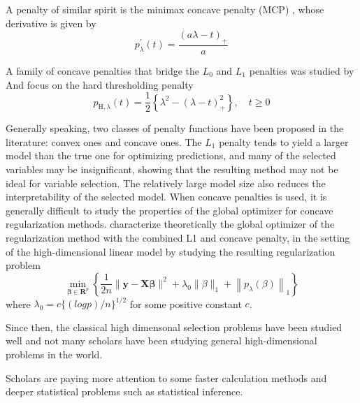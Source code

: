 \documentclass[]{article}
\begin{document}
A penalty of similar spirit is the minimax concave penalty (MCP)
\citet{zhang2011iterative}, whose derivative is given by
\begin{equation}
  p_{\lambda}^{\prime}(t)=\frac{(a \lambda-t)_{+}}{a}
\end{equation}

A family of concave penalties that bridge the \(L_0\) and \(L_1\)
penalties was studied by \citet{lv2009unified} And \citet{zheng2014high}
focus on the hard thresholding penalty \begin{equation}
  p_{\mathrm{H}, \lambda}(t)=\frac{1}{2}\left\{\lambda^{2}-(\lambda-t)_{+}^{2}\right\}, \quad t \geqslant 0
\end{equation}

Generally speaking, two classes of penalty functions have been proposed
in the literature: convex ones and concave ones. The \(L_1\) penalty
tends to yield a larger model than the true one for optimizing
predictions, and many of the selected variables may be insignificant,
showing that the resulting method may not be ideal for variable
selection. The relatively large model size also reduces the
interpretability of the selected model. When concave penalties is used,
it is generally difficult to study the properties of the global
optimizer for concave regularization methods. \citet{fan2013asymptotic}
characterize theoretically the global optimizer of the regularization
method with the combined L1 and concave penalty, in the setting of the
high-dimensional linear model by studying the resulting regularization
problem \begin{equation}
  \min _{\boldsymbol{\beta} \in \mathbf{R}^{p}} \left\{\frac{1}{2 n}\|\mathbf{y}-\mathbf{X} \boldsymbol{\beta}\|^{2} +\lambda_{0}\|\beta\|_{1}+\left\|p_{\lambda}(\beta)\right\|_{1}\right\}
\end{equation} where \(\lambda_0 = c\{(log p)/n\}^{1/2}\) for some
positive constant \(c\).

Since then, the classical high dimensonal selection problems have been
studied well and not many scholars have been studying general
high-dimensional problems in the world.

Scholars are paying more attention to some faster calculation methods
and deeper statistical problems such as statistical inference.


\end{document}
